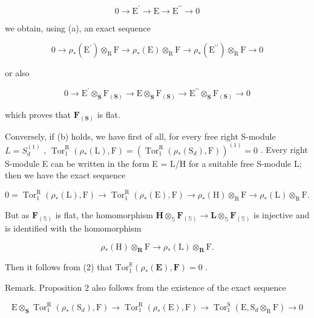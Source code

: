\[
0 \rightarrow \mathrm{E} ^ {\prime} \rightarrow \mathrm{E} \rightarrow \mathrm{E} ^ {\prime \prime} \rightarrow 0
\]

we obtain, using (a), an exact sequence

\[
0 \rightarrow \rho_ {*} (\mathrm{E} ^ {\prime}) \otimes_ {\mathrm{R}} \mathrm{F} \rightarrow \rho_ {*} (\mathrm{E}) \otimes_ {\mathrm{R}} \mathrm{F} \rightarrow \rho_ {*} (\mathrm{E} ^ {\prime \prime}) \otimes_ {\mathrm{R}} \mathrm{F} \rightarrow 0
\]

or also

\[
0 \rightarrow \mathrm{E} ^ {\prime} \otimes_ {\mathbf {S}} \mathrm{F} _ {(\mathbf {S})} \rightarrow \mathrm{E} \otimes_ {\mathbf {S}} \mathrm{F} _ {(\mathbf {S})} \rightarrow \mathrm{E} ^ {\prime \prime} \otimes_ {\mathbf {S}} \mathrm{F} _ {(\mathbf {S})} \rightarrow 0
\]

which proves that \(\mathbf{F}_{(\mathbf{S})}\) is flat.

Conversely, if (b) holds, we have first of all, for every free right S-module \(L = S_{d}^{(1)}\) , \(\operatorname{Tor}_{1}^{\mathrm{R}}(\rho_{*}(\mathrm{L}), \mathrm{F}) = (\operatorname{Tor}_{1}^{\mathrm{R}}(\rho_{*}(\mathrm{S}_{d}), \mathrm{F}))^{(1)} = 0\) . Every right S-module E can be written in the form E = L/H for a suitable free S-module L; then we have the exact sequence

\[
0 = \operatorname{Tor} _ {1} ^ {\mathrm{R}} (\rho_ {*} (\mathrm{L}), \mathrm{F}) \rightarrow \operatorname{Tor} _ {1} ^ {\mathrm{R}} (\rho_ {*} (\mathrm{E}), \mathrm{F}) \rightarrow \rho_ {*} (\mathrm{H}) \otimes_ {\mathrm{R}} \mathrm{F} \rightarrow \rho_ {*} (\mathrm{L}) \otimes_ {\mathrm{R}} \mathrm{F}. \tag {2}
\]

But as \(\mathbf{F}_{(\mathbb{S})}\) is flat, the homomorphism \(\mathbf{H} \otimes_{\mathbb{S}} \mathbf{F}_{(\mathbb{S})} \to \mathbf{L} \otimes_{\mathbb{S}} \mathbf{F}_{(\mathbb{S})}\) is injective and is identified with the homomorphism

\[
\rho_ {*} (\mathrm{H}) \otimes_ {\mathbf {R}} \mathrm{F} \rightarrow \rho_ {*} (\mathrm{L}) \otimes_ {\mathbf {R}} \mathrm{F}.
\]

Then it follows from (2) that \(\mathrm{Tor}_1^{\mathbb{R}}(\rho_*(\mathbf{E}),\mathbf{F}) = 0\) .

Remark. Proposition 2 also follows from the existence of the exact sequence

\[
\mathrm{E} \otimes_ {\mathbf {S}} \operatorname{Tor} _ {1} ^ {\mathrm{R}} (\rho_ {*} (\mathrm{S} _ {d}), \mathrm{F}) \rightarrow \operatorname{Tor} _ {1} ^ {\mathrm{R}} (\rho_ {*} (\mathrm{E}), \mathrm{F}) \rightarrow \operatorname{Tor} _ {1} ^ {\mathrm{S}} (\mathrm{E}, \mathrm{S} _ {d} \otimes_ {\mathrm{R}} \mathrm{F}) \rightarrow 0
\]

